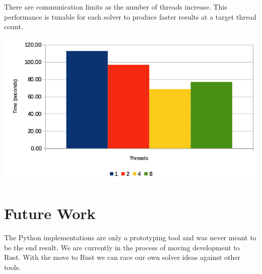 \documentclass{acm_proc_article-sp}
\begin{document}
There are communication limits as the number of threads increase. This performance is tunable for each solver to produce faster results at a target thread count.

\begin{centering}
\includegraphics[width=.9\linewidth]{os}

\end{centering}


\section{Future Work}
The Python implementations are only a prototyping tool and was never meant to be the end result. We are currently in the process of moving development to Rust. With the move to Rust we can race our own solver ideas against other tools.


%
\nocite{*} %

%
%
\balancecolumns



\end{document}
